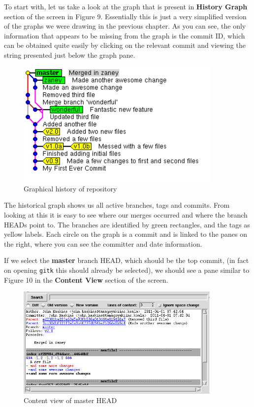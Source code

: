 To start with, let us take a look at the graph that is present in \textbf{History Graph} section of the screen in Figure 9.
Essentially this is just a very simplified version of the graphs we were drawing in the previous chapter.
As you can see, the only information that appears to be missing from the graph is the commit ID, which can be obtained quite easily by clicking on the relevant commit and viewing the string presented just below the graph pane.

\begin{figure}[hbt]
\centering
\includegraphics[width=10cm]{images/f-w5-d9.png}
\caption{Graphical history of repository}
\end{figure}

The historical graph shows us all active branches, tags and commits.
From looking at this it is easy to see where our merges occurred and where the branch HEADs point to.
The branches are identified by green rectangles, and the tags as yellow labels.
Each circle on the graph is a commit and is linked to the panes on the right, where you can see the committer and date information.

If we select the \textbf{master} branch HEAD, which should be the top commit, (in fact on opening \texttt{gitk} this should already be selected), we should see a pane similar to Figure 10 in the \textbf{Content View} section of the screen.

\begin{figure}[hbt]
\centering
\includegraphics[width=10cm]{images/f-w5-d10.png}
\caption{Content view of master HEAD}
\end{figure}

